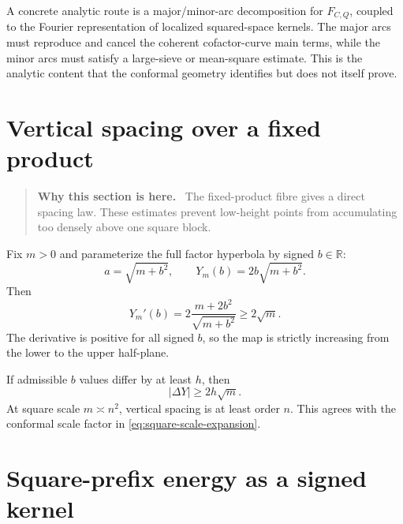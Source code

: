 \documentclass[11pt]{article}
\theoremstyle{definition}
\theoremstyle{remark}
\newcommand{\1}{\mathbf{1}}
\newcommand{\R}{\mathbb{R}}
\newenvironment{motivation}
  {\begin{quote}\small\color{ovvogray}\textbf{Why this section is here.}\ }
  {\end{quote}}
\begin{document}
A concrete analytic route is a major/minor-arc decomposition for
$F_{C,Q}$, coupled to the Fourier representation of localized
squared-space kernels.  The major arcs must reproduce and cancel the
coherent cofactor-curve main terms, while the minor arcs must satisfy a
large-sieve or mean-square estimate.  This is the analytic content that
the conformal geometry identifies but does not itself prove.

\section{Vertical spacing over a fixed product}
\label{sec:vertical-spacing}

\begin{motivation}
The fixed-product fibre gives a direct spacing law.  These estimates prevent low-height points from accumulating too densely above one square block.
\end{motivation}

Fix $m>0$ and parameterize the full factor hyperbola by signed $b\in\R$:
\begin{equation}
 a=\sqrt{m+b^2},
 \qquad
 Y_m(b)=2b\sqrt{m+b^2}.
 \label{eq:Y-b}
\end{equation}
Then
\begin{equation}
 Y_m'(b)
 =2\frac{m+2b^2}{\sqrt{m+b^2}}
 \ge2\sqrt m.
 \label{eq:Y-derivative}
\end{equation}
The derivative is positive for all signed $b$, so the map is strictly increasing from the lower to the upper half-plane.

If admissible $b$ values differ by at least $h$, then
\begin{equation}
 |\Delta Y|\ge2h\sqrt m.
 \label{eq:Y-spacing}
\end{equation}
At square scale $m\asymp n^2$, vertical spacing is at least order $n$.  This agrees with the conformal scale factor in \cref{eq:square-scale-expansion}.

\section{Square-prefix energy as a signed kernel}
\label{sec:variance-kernel}
\end{document}
